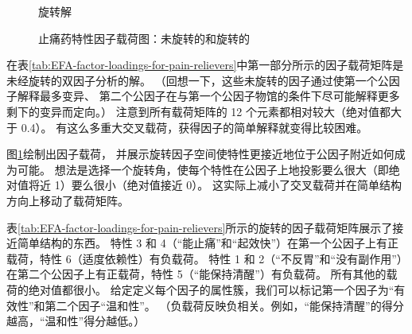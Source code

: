 \begin{figure}
\begin{floatrow}
{\begin{subfloatrow}
{
                }{\caption{旋转解}}   
            \end{subfloatrow}
        }{
            \caption{止痛药特性因子载荷图：未旋转的和旋转的}
            \label{fig:EFA-plot-of-factor-loadings-for-attributes-of-pain-relievers}
        }
    \end{floatrow}
\end{figure}

在表\ref{tab:EFA-factor-loadings-for-pain-relievers}中第一部分所示的因子载荷矩阵是未经旋转的双因子分析的解。
（回想一下，这些未旋转的因子通过使第一个公因子解释最多变异、
第二个公因子在与第一个公因子物馆的条件下尽可能解释更多剩下的变异而定向。）
注意到所有载荷矩阵的 12 个元素都相对较大（绝对值都大于 0.4）。
有这么多重大交叉载荷，获得因子的简单解释就变得比较困难。

图\ref{fig:EFA-plot-of-factor-loadings-for-attributes-of-pain-relievers}绘制出因子载荷，
并展示旋转因子空间使特性更接近地位于公因子附近如何成为可能。
想法是选择一个旋转角，使每个特性在公因子上地投影要么很大（即绝对值将近 1）要么很小（绝对值接近 0）。
这实际上减小了交叉载荷并在简单结构方向上移动了载荷矩阵。

表\ref{tab:EFA-factor-loadings-for-pain-relievers}所示的旋转的因子载荷矩阵展示了接近简单结构的东西。
特性 3 和 4（“能止痛”和“起效快”）在第一个公因子上有正载荷，特性 6（适度依赖性）有负载荷。
特性 1 和 2（“不反胃”和“没有副作用”）在第二个公因子上有正载荷，特性 5（“能保持清醒”）有负载荷。
所有其他的载荷的绝对值都很小。
给定定义每个因子的属性簇，我们可以标记第一个因子为“有效性”和第二个因子“温和性”。
（负载荷反映负相关。例如，“能保持清醒”的得分越高，“温和性”得分越低。）

